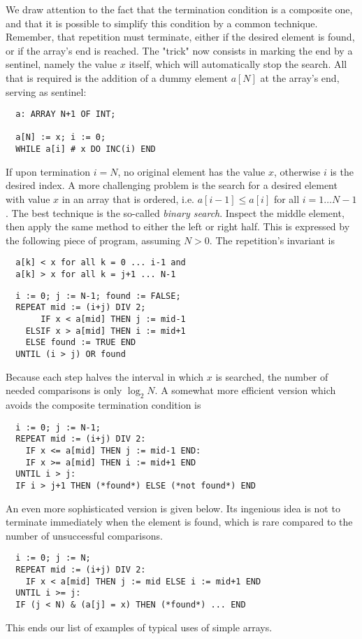 We draw attention to the fact that the termination condition is a composite one, and that
it is possible to simplify this condition by a common technique. Remember, that repetition
must terminate, either if the desired element is found, or if the array's end is reached.
The "trick" now consists in marking the end by a sentinel, namely the value $x$ itself,
which will automatically stop the search. All that is required is the addition of a dummy
element $a[N]$ at the array's end, serving as sentinel:
\begin{verbatim}
  a: ARRAY N+1 OF INT;

  a[N] := x; i := 0;
  WHILE a[i] # x DO INC(i) END
\end{verbatim}
If upon termination $i = N$, no original element has the value $x$, otherwise $i$ is the
desired index.  A more challenging problem is the search for a desired element with value
$x$ in an array that is ordered, i.e. $a[i-1] \le a[i]$ for all $i = 1\dots N-1$. The best
technique is the so-called \emph{binary search}.  Inspect the middle element, then apply
the same method to either the left or right half. This is expressed by the following piece
of program, assuming $N > 0$. The repetition's invariant is
\begin{verbatim}
  a[k] < x for all k = 0 ... i-1 and
  a[k] > x for all k = j+1 ... N-1
\end{verbatim}
\begin{verbatim}
  i := 0; j := N-1; found := FALSE;
  REPEAT mid := (i+j) DIV 2;
       IF x < a[mid] THEN j := mid-1
    ELSIF x > a[mid] THEN i := mid+1
    ELSE found := TRUE END
  UNTIL (i > j) OR found
\end{verbatim}
Because each step halves the interval in which $x$ is searched, the number of needed
comparisons is only $\log_2{N}$. A somewhat more efficient version which avoids the
composite termination condition is
\begin{verbatim}
  i := 0; j := N-1;
  REPEAT mid := (i+j) DIV 2:
    IF x <= a[mid] THEN j := mid-1 END:
    IF x >= a[mid] THEN i := mid+1 END
  UNTIL i > j:
  IF i > j+1 THEN (*found*) ELSE (*not found*) END
\end{verbatim}
An even more sophisticated version is given below. Its ingenious idea is not to terminate
immediately when the element is found, which is rare compared to the number of
unsuccessful comparisons.
\begin{verbatim}
  i := 0; j := N;
  REPEAT mid := (i+j) DIV 2:
    IF x < a[mid] THEN j := mid ELSE i := mid+1 END
  UNTIL i >= j:
  IF (j < N) & (a[j] = x) THEN (*found*) ... END
\end{verbatim}
This ends our list of examples of typical uses of simple arrays.

